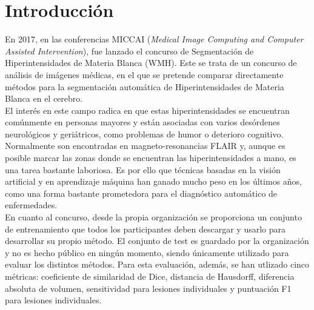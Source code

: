 \documentclass[spanish,a4paper, 11pt]{article}
\numberwithin{equation}{section}
\numberwithin{table}{section}
\numberwithin{figure}{section}
\begin{document}
\setcounter{page}{3}
\section{Introducción}


En 2017, en las conferencias MICCAI (\textit{Medical Image Computing and Computer Assisted Intervention}), fue lanzado el concurso de Segmentación de Hiperintensidades de Materia Blanca (WMH). Este se trata de un concurso de análisis de imágenes médicas, en el que se pretende comparar directamente métodos para la segmentación automática de Hiperintensidades de Materia Blanca en el cerebro.\\
	
El interés en este campo radica en que estas hiperintensidades se encuentran comúnmente en personas mayores y están asociadas con varios desórdenes neurológicos y geriátricos, como problemas de humor o deterioro cognitivo.\\
	
Normalmente son encontradas en magneto-resonancias FLAIR y, aunque es posible marcar las zonas donde se encuentran las hiperintensidades a mano, es una tarea bastante laboriosa. Es por ello que técnicas basadas en la visión artificial y en aprendizaje máquina han ganado mucho peso en los últimos años, como una forma bastante prometedora para el diagnóstico automático de enfermedades.\\
	
En cuanto al concurso, desde la propia organización se proporciona un conjunto de entrenamiento que todos los participantes deben descargar y usarlo para desarrollar su propio método. El conjunto de test es guardado por la organización y no es hecho público en ningún momento, siendo únicamente utilizado para evaluar los distintos métodos. Para esta evaluación, además,  se han utlizado cinco métricas: coeficiente de similaridad de Dice, distancia de Hausdorff, diferencia absoluta de volumen, sensitividad para lesiones individuales y puntuación F1 para lesiones individuales.\\
\end{document}
